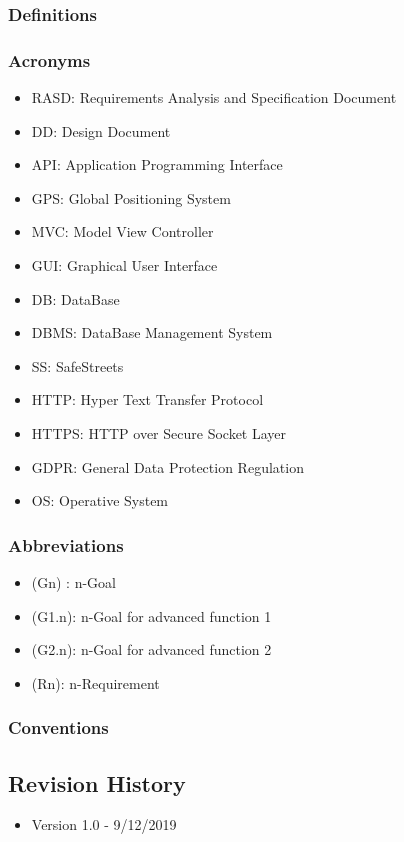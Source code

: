\subsubsection{Definitions}
\subsubsection{Acronyms}
\begin{itemize}
	\item RASD: Requirements Analysis and Specification Document
	\item DD: Design Document
	\item API: Application Programming Interface
	\item GPS: Global Positioning System
	\item MVC: Model View Controller
	\item GUI: Graphical User Interface
	\item DB: DataBase
	\item DBMS: DataBase Management System
	\item SS: SafeStreets
	\item HTTP: Hyper Text Transfer Protocol
	\item HTTPS: HTTP over Secure Socket Layer
	\item GDPR: General Data Protection Regulation
	\item OS: Operative System
\end{itemize}
\subsubsection{Abbreviations}
\begin{itemize}
	\item (Gn) : n-Goal
	\item (G1.n): n-Goal for advanced function 1
	\item (G2.n): n-Goal for advanced function 2
	\item (Rn): n-Requirement
\end{itemize}
\subsubsection{Conventions}
\subsection{Revision History}
\begin{itemize}
	\item Version 1.0 - 9/12/2019
\end{itemize}
